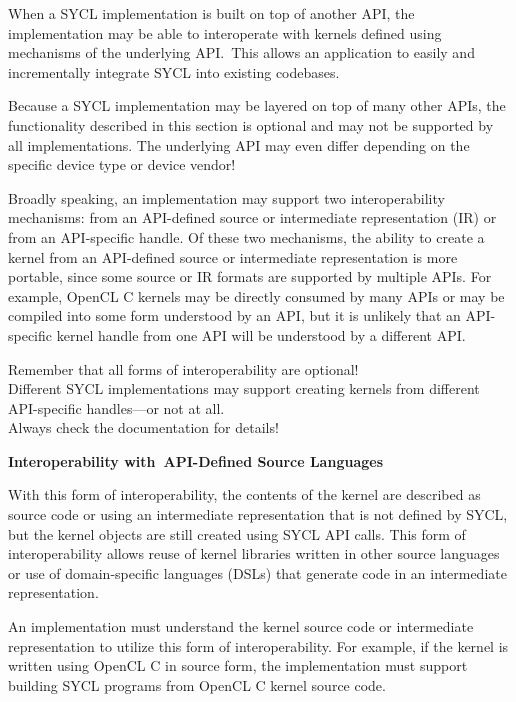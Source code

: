 When a SYCL implementation is built on top of another API, the implementation may be able to interoperate with kernels defined using mechanisms of the underlying API. This allows an application to easily and incrementally integrate SYCL into existing codebases.\par

Because a SYCL implementation may be layered on top of many other APIs, the functionality described in this section is optional and may not be supported by all implementations. The underlying API may even differ depending on the specific device type or device vendor!\par

Broadly speaking, an implementation may support two interoperability mechanisms: from an API-defined source or intermediate representation (IR) or from an API-specific handle. Of these two mechanisms, the ability to create a kernel from an API-defined source or intermediate representation is more portable, since some source or IR formats are supported by multiple APIs. For example, OpenCL C kernels may be directly consumed by many APIs or may be compiled into some form understood by an API, but it is unlikely that an API-specific kernel handle from one API will be understood by a different API.\par

\begin{tcolorbox}[colback=red!5!white,colframe=red!75!black]
Remember that all forms of interoperability are optional!\\
Different SYCL implementations may support creating kernels from different API-specific handles—or not at all.\\
Always check the documentation for details!
\end{tcolorbox}

\hspace*{\fill} \par %
\textbf{Interoperability with API-Defined Source Languages}

With this form of interoperability, the contents of the kernel are described as source code or using an intermediate representation that is not defined by SYCL, but the kernel objects are still created using SYCL API calls. This form of interoperability allows reuse of kernel libraries written in other source languages or use of domain-specific languages (DSLs) that generate code in an intermediate representation.\par

An implementation must understand the kernel source code or intermediate representation to utilize this form of interoperability. For example, if the kernel is written using OpenCL C in source form, the implementation must support building SYCL programs from OpenCL C kernel source code.\par

